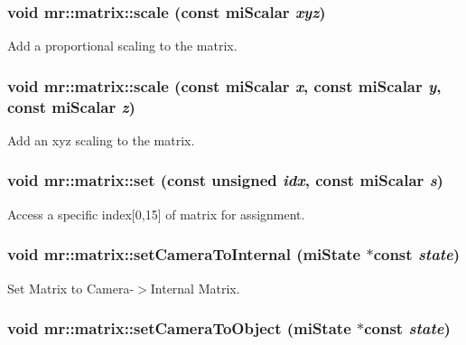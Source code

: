 \subsubsection{\setlength{\rightskip}{0pt plus 5cm}void mr::matrix::scale (const mi\-Scalar {\em xyz})\hspace{0.3cm}{\tt  [inline]}}\label{classmr_1_1matrix_z23_21}


Add a proportional scaling to the matrix. 

\subsubsection{\setlength{\rightskip}{0pt plus 5cm}void mr::matrix::scale (const mi\-Scalar {\em x}, const mi\-Scalar {\em y}, const mi\-Scalar {\em z})\hspace{0.3cm}{\tt  [inline]}}\label{classmr_1_1matrix_z23_20}


Add an xyz scaling to the matrix. 

\subsubsection{\setlength{\rightskip}{0pt plus 5cm}void mr::matrix::set (const unsigned {\em idx}, const mi\-Scalar {\em s})\hspace{0.3cm}{\tt  [inline]}}\label{classmr_1_1matrix_z22_4}


Access a specific index[0,15] of matrix for assignment. 

\subsubsection{\setlength{\rightskip}{0pt plus 5cm}void mr::matrix::set\-Camera\-To\-Internal (mi\-State $\ast$const {\em state})\hspace{0.3cm}{\tt  [inline]}}\label{classmr_1_1matrix_z18_7}


Set Matrix to Camera-$>$Internal Matrix. 

\subsubsection{\setlength{\rightskip}{0pt plus 5cm}void mr::matrix::set\-Camera\-To\-Object (mi\-State $\ast$const {\em state})\hspace{0.3cm}{\tt  [inline]}}\label{classmr_1_1matrix_z18_10}


